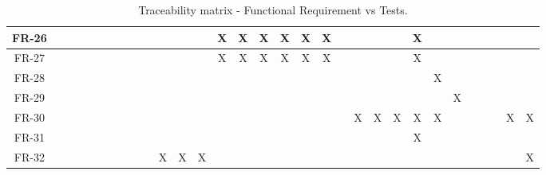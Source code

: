\begin{sidewaystable}
\begin{adjustbox}{max width=\textwidth}
\begin{tabular}{| c | *{30}{c}|}
    FR-26   &       &       &       &       &       &       &       &       &       &       &       &       & X     & X     & X     & X     & X     & X      &       &       &       &       & X     &       &       &       &       &       &       &         \\ \hline
    FR-27   &       &       &       &       &       &       &       &       &       &       &       &       & X     & X     & X     & X     & X     & X     &       &       &       &       & X     &       &       &       &       &       &       &         \\ \hline
    FR-28   &       &       &       &       &       &       &       &       &       &       &       &       &       &       &       &       &       &       &       &       &       &       &       & X     &       &       &       &       &       &         \\ \hline
    FR-29   &       &       &       &       &       &       &       &       &       &       &       &       &       &       &       &       &       &       &       &       &       &       &       &       &  X    &       &       &       &       &         \\ \hline
    FR-30   &       &       &       &       &       &       &       &       &       &       &       &       &       &       &       &       &       &       &       & X     & X     & X     & X     & X     &       &       &       &       & X     & X       \\ \hline
    FR-31   &       &       &       &       &       &       &       &       &       &       &       &       &       &       &       &       &       &       &       &       &       &       & X     &       &       &       &       &       &       &         \\ \hline
    FR-32   &       &       &       &       &       &       &       &       &       & X     & X     & X     &       &       &       &       &       &       &       &       &       &       &       &       &       &       &       &       &       & X       \\ \hline
        \end{tabular}
        \end{adjustbox}                                                                        
\caption{Traceability matrix - Functional Requirement vs Tests.}
\label{T:traceability_matrix_fr_vs_tests}
\end{sidewaystable}
